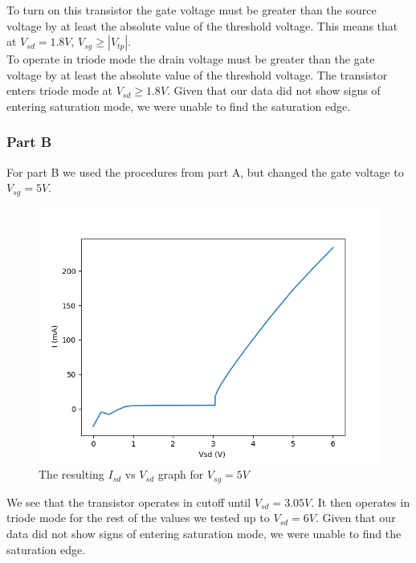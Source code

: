 \FloatBarrier
To turn on this transistor the gate voltage must be greater than the source voltage by at least the absolute value of the threshold voltage. 
This means that at $V_{sd} = 1.8 V$, $V_{sg} \ge |V_{tp}|$.
\\

To operate in triode mode the drain voltage must be greater than the gate voltage by at least the absolute value of the threshold voltage.
The transistor enters triode mode at $ V_{sd} \ge 1.8V$.
Given that our data did not show signs of entering saturation mode, we were unable to find the saturation edge.
\\

\subsubsection{Part B}
For part B we used the procedures from part A, but changed the gate voltage to $V_{sg} = 5 V$. 

\FloatBarrier

\begin{figure}[h!]
	\centering
	\includegraphics[scale=0.75]{./data/pmos_5v.png}
	\caption{The resulting $I_{sd}$ vs $V_{sd}$ graph for $V_{sg}=5V$}
	\label{fig:pmos_5v}
\end{figure}

\FloatBarrier
We see that the transistor operates in cutoff until $V_{sd} = 3.05 V$.
It then operates in triode mode for the rest of the values we tested up to $V_{sd}=6V$.
Given that our data did not show signs of entering saturation mode, we were unable to find the saturation edge.
